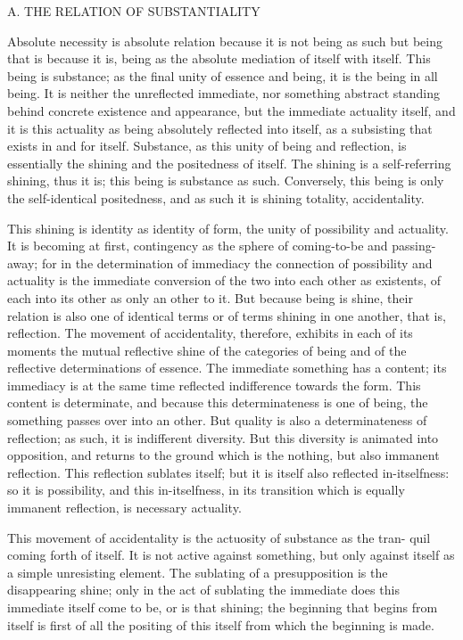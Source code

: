 
A. THE RELATION OF SUBSTANTIALITY

Absolute necessity is absolute relation because it is not being as such but
being that is because it is, being as the absolute mediation of itself with
itself.
This being is substance;
as the final unity of essence and being,
it is the being in all being.
It is neither the unreflected immediate, nor
something abstract standing behind concrete existence and appearance,
but the immediate actuality itself,
and it is this actuality as being absolutely
reflected into itself,
as a subsisting that exists in and for itself.
Substance, as this unity of being and reflection,
is essentially the shining and the positedness of itself.
The shining is a self-referring shining, thus it is;
this being is substance as such.
Conversely, this being is only the self-identical positedness,
and as such it is shining totality, accidentality.

This shining is identity as identity of form,
the unity of possibility and actuality.
It is becoming at first, contingency as the sphere of coming-to-be
and passing-away;
for in the determination of immediacy the connection
of possibility and actuality is the immediate conversion of the two into each
other as existents, of each into its other as only an other to it.
But because being is shine, their relation is also one of identical terms or of terms
shining in one another, that is, reflection.
The movement of accidentality,
therefore, exhibits in each of its moments the mutual reflective shine of
the categories of being and of the reflective determinations of essence.
The immediate something has a content;
its immediacy is at the same time
reflected indifference towards the form.
This content is determinate, and
because this determinateness is one of being, the something passes over into
an other.
But quality is also a determinateness of reflection;
as such, it is indifferent diversity.
But this diversity is animated into opposition,
and returns to the ground which is the nothing, but also immanent reflection.
This reflection sublates itself;
but it is itself also reflected in-itselfness: so
it is possibility, and this in-itselfness, in its transition which is equally
immanent reflection, is necessary actuality.

This movement of accidentality is the actuosity of substance as the tran-
quil coming forth of itself.
It is not active against something,
but only against itself as a simple unresisting element.
 The sublating of a presupposition is the disappearing shine;
 only in the act of sublating the immediate does this
immediate itself come to be, or is that shining;
the beginning that begins from itself is first of all
the positing of this itself from which the beginning is made.

